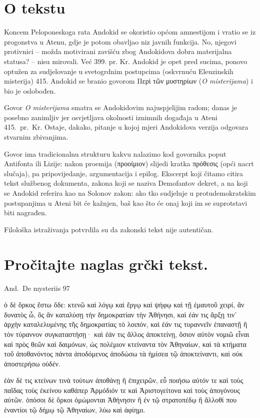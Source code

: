 \section*{O tekstu}

Koncem Peloponeskoga rata Andokid se okoristio općom amnestijom i vratio se iz progonstva u Atenu, gdje je potom obavljao niz javnih funkcija. No, njegovi protivnici – možda motivirani zavišću zbog Andokidova dobra materijalna statusa? – nisu mirovali. Već 399. pr. Kr. Andokid je opet pred sucima, ponovo optužen za sudjelovanje u svetogrdnim postupcima (oskvrnuću Eleuzinskih misterija) 415. Andokid se branio govorom \textgreek[variant=ancient]{Περὶ τῶν μυστηρίων} (\textit{O misterijama}) i bio je oslobođen.

Govor \textit{O misterijama} smatra se Andokidovim najuspjelijim radom; danas je posebno zanimljiv jer osvjetljava okolnosti iznimnih događaja u Ateni 415.\ pr.~Kr. Ostaje, dakako, pitanje u kojoj mjeri Andokidova verzija odgovara stvarnim zbivanjima.

Govor ima tradicionalnu strukturu kakvu nalazimo kod govornika poput Antifonta ili Lizije: nakon proemija (προοίμιον) slijedi kratka πρόθεσις (opći nacrt slučaja), pa pripovijedanje, argumentacija i epilog. Ekscerpt koji čitamo citira tekst službenog dokumenta, zakona koji se naziva Demofantov dekret, a na koji se Andokid referira kao na Solonov zakon: ako tko sudjeluje u protudemokratskim postupanjima u Ateni bit će kažnjen, baš kao što će onaj koji im se suprotstavi biti nagrađen.

Filološka istraživanja potvrdila su da zakonski tekst nije autentičan.



\newpage

\section*{Pročitajte naglas grčki tekst.}

And.\ De mysteriis 97


\medskip


{\large

\begin{greek}

\noindent ὁ δὲ ὅρκος ἔστω ὅδε: κτενῶ καὶ λόγῳ καὶ ἔργῳ καὶ ψήφῳ καὶ τῇ ἐμαυτοῦ χειρί, ἂν δυνατὸς ὦ, ὃς ἂν καταλύσῃ τὴν δημοκρατίαν τὴν Ἀθήνησι, καὶ ἐάν τις ἄρξῃ τιν᾽ ἀρχὴν καταλελυμένης τῆς δημοκρατίας τὸ λοιπόν, καὶ ἐάν τις τυραννεῖν ἐπαναστῇ ἢ τὸν τύραννον συγκαταστήσῃ· καὶ ἐάν τις ἄλλος ἀποκτείνῃ, ὅσιον αὐτὸν νομιῶ εἶναι καὶ πρὸς θεῶν καὶ δαιμόνων, ὡς πολέμιον κτείναντα τὸν Ἀθηναίων, καὶ τὰ κτήματα τοῦ ἀποθανόντος πάντα ἀποδόμενος ἀποδώσω τὰ ἡμίσεα τῷ ἀποκτείναντι, καὶ οὐκ ἀποστερήσω οὐδέν.

ἐὰν δέ τις κτείνων τινὰ τούτων ἀποθάνῃ ἢ ἐπιχειρῶν, εὖ ποιήσω αὐτόν τε καὶ τοὺς παῖδας τοὺς ἐκείνου καθάπερ Ἁρμόδιόν τε καὶ Ἀριστογείτονα καὶ τοὺς ἀπογόνους αὐτῶν. ὁπόσοι δὲ ὅρκοι ὀμώμονται Ἀθήνησιν ἢ ἐν τῷ στρατοπέδῳ ἢ ἄλλοθί που ἐναντίοι τῷ δήμῳ τῷ Ἀθηναίων, λύω καὶ ἀφίημι.

\end{greek}

}


